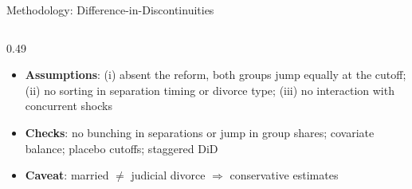 \documentclass[aspectratio=169,10pt]{beamer}
\begin{document}
\begin{frame}{Methodology: Difference-in-Discontinuities}
\begin{columns}[T,onlytextwidth]
\begin{column}{0.49\textwidth}
    \raggedright
    \begin{itemize}\setlength{\itemsep}{1pt}
      \item \textbf{Assumptions}: (i) absent the reform, both groups jump equally at the cutoff; (ii) no sorting in separation timing or divorce type; (iii) no interaction with concurrent shocks
      \item \textbf{Checks}: no bunching in separations or jump in group shares; covariate balance; placebo cutoffs; staggered DiD
      \item \textbf{Caveat}: married $\neq$ judicial divorce $\Rightarrow$ conservative estimates
    \end{itemize}
  \end{column}
\end{columns}
\end{frame}
\end{document}
